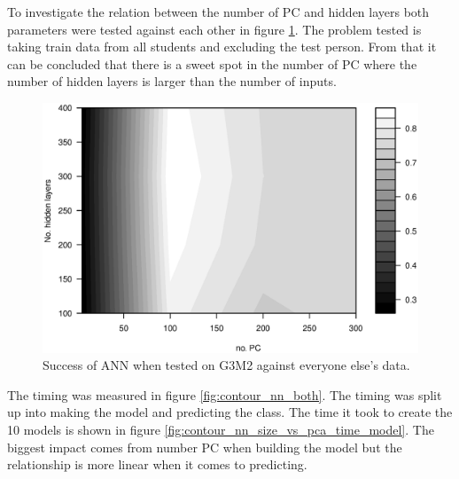 

To investigate the relation between the number of PC and hidden layers both parameters were tested against each other in figure \ref{fig:contour_nn_size_vs_pca}. 
The problem tested is taking train data from all students and excluding the test person. 
From that it can be concluded that there is a sweet spot in the number of PC where the number of hidden layers is larger than the number of inputs.

\begin{figure}[h]
    \includegraphics[width=\textwidth]{graphics/contour_nn_size_vs_pca}
    \caption[Success of ANN, PC vs HL]{Success of ANN when tested on G3M2 against everyone else's data.}
    \label{fig:contour_nn_size_vs_pca}
\end{figure}

The timing was measured in figure \ref{fig:contour_nn_both}.
The timing was split up into making the model and predicting the class.
The time it took to create the 10 models is shown in figure \ref{fig:contour_nn_size_vs_pca_time_model}.
The biggest impact comes from number PC when building the model but the relationship is more linear when it comes to predicting.

